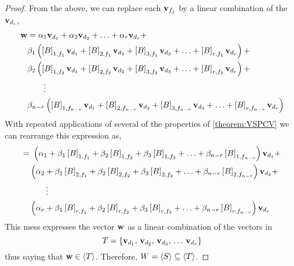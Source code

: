 \documentclass{ximera}
\begin{document}
\begin{theorem}
\begin{proof}
    From the above, we can replace each $\mathbf{v}_{f_j}$ by a linear
    combination of the $\mathbf{v}_{d_i}$,
    \begin{align*}
      \mathbf{w}&=
                \alpha_1\mathbf{v}_{d_1}+
                \alpha_2\mathbf{v}_{d_2}+
                \ldots+
                \alpha_r\mathbf{v}_{d_r}+\\
              &\beta_1\left(
                \left\lbrack B\right\rbrack_{1,f_1}\mathbf{v}_{d_1}+
                \left\lbrack B\right\rbrack_{2,f_1}\mathbf{v}_{d_2}+
                \left\lbrack B\right\rbrack_{3,f_1}\mathbf{v}_{d_3}+
                \ldots+
                \left\lbrack B\right\rbrack_{r,f_1}\mathbf{v}_{d_r}
                \right)+\\
              &\beta_2\left(
                \left\lbrack B\right\rbrack_{1,f_2}\mathbf{v}_{d_1}+
                \left\lbrack B\right\rbrack_{2,f_2}\mathbf{v}_{d_2}+
                \left\lbrack B\right\rbrack_{3,f_2}\mathbf{v}_{d_3}+
                \ldots+
                \left\lbrack B\right\rbrack_{r,f_2}\mathbf{v}_{d_r}
                \right)+\\
              &\quad\quad\vdots\\
              &\beta_{n-r}\left(
                \left\lbrack B\right\rbrack_{1,f_{n-r}}\mathbf{v}_{d_1}+
                \left\lbrack B\right\rbrack_{2,f_{n-r}}\mathbf{v}_{d_2}+
                \left\lbrack B\right\rbrack_{3,f_{n-r}}\mathbf{v}_{d_3}+
                \ldots+
                \left\lbrack B\right\rbrack_{r,f_{n-r}}\mathbf{v}_{d_r}
                \right)
    \end{align*}
    With repeated applications of several of the properties of \ref{theorem:VSPCV} we can rearrange this expression as,
    \begin{align*}
      =&\ \left(
         \alpha_1+
         \beta_1\left\lbrack B\right\rbrack_{1,f_1}+
         \beta_2\left\lbrack B\right\rbrack_{1,f_2}+
         \beta_3\left\lbrack B\right\rbrack_{1,f_3}+
         \ldots+
         \beta_{n-r}\left\lbrack B\right\rbrack_{1,f_{n-r}}
         \right)\mathbf{v}_{d_1}+\\
       &\left(\alpha_2+
         \beta_1\left\lbrack B\right\rbrack_{2,f_1}+
         \beta_2\left\lbrack B\right\rbrack_{2,f_2}+
         \beta_3\left\lbrack B\right\rbrack_{2,f_3}+
         \ldots+
         \beta_{n-r}\left\lbrack B\right\rbrack_{2,f_{n-r}}
         \right)\mathbf{v}_{d_2}+\\
       &\quad\quad\vdots\\
       &\left(\alpha_r+
         \beta_1\left\lbrack B\right\rbrack_{r,f_1}+
         \beta_2\left\lbrack B\right\rbrack_{r,f_2}+
         \beta_3\left\lbrack B\right\rbrack_{r,f_3}+
         \ldots+\beta_{n-r}\left\lbrack B\right\rbrack_{r,f_{n-r}}
         \right)\mathbf{v}_{d_r}
    \end{align*}
    This mess expresses the vector $\mathbf{w}$ as a linear combination of the vectors in
    \[
      T=\left\{\mathbf{v}_{d_1},\,\mathbf{v}_{d_2},\,\mathbf{v}_{d_3},\,\ldots\,\mathbf{v}_{d_r}\right\}
    \]
    thus saying that $\mathbf{w}\in\left\langle T\right\rangle$.  Therefore, $W=\left\langle S\right\rangle\subseteq\left\langle T\right\rangle$.
  \end{proof}
\end{theorem}
\end{document}
